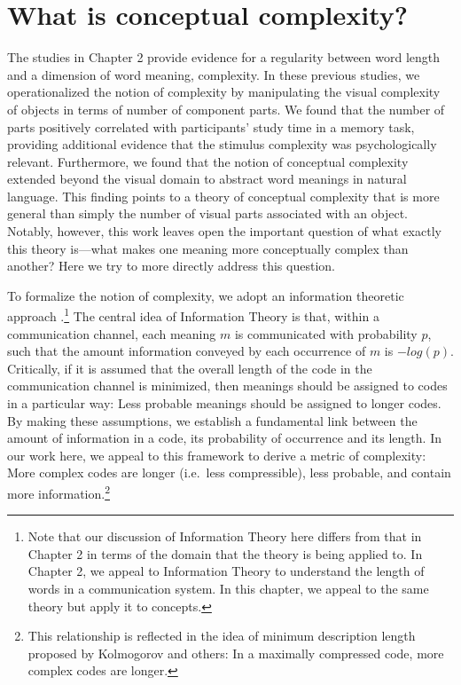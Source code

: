 
\chapter{What is conceptual complexity?}
\label{chapter:complexity}

The studies in Chapter 2 provide evidence for a regularity between word length and a dimension of word meaning, complexity. In these previous studies, we operationalized the notion of complexity by manipulating the visual complexity of objects in terms of number of component parts. We found that the number of parts  positively correlated with participants' study time in a memory task, providing additional evidence that the stimulus complexity was psychologically relevant. Furthermore, we found that the notion of conceptual complexity extended beyond the visual domain to abstract word meanings in natural language. This finding points to a theory of conceptual complexity that is more general than simply the number of visual parts associated with an object.  Notably, however, this work leaves open the important question of what exactly this theory is---what makes one meaning more conceptually complex than another? Here we try to more directly address this question. 

To formalize the notion of complexity, we adopt an information theoretic approach \cite{shannon1948}.\footnote{Note that our discussion of Information Theory here differs from that in Chapter 2 in terms of the domain that the theory is being applied to. In Chapter 2, we appeal to Information Theory to understand the length of words in a communication system. In this chapter, we appeal to the same theory but apply it to  concepts. } The central idea of Information Theory is that, within a communication channel, each meaning $m$ is communicated with probability $p$, such that the amount information conveyed by each occurrence of $m$ is $-log(p)$. Critically, if it is assumed that the overall length of the code in the communication channel is minimized, then meanings should be assigned to codes in a particular way: Less probable meanings should be assigned to longer codes. By making these assumptions, we establish a fundamental link between the amount of information in a code, its probability of occurrence and its length. In our work here, we appeal to this framework to derive a metric of complexity: More complex codes are longer (i.e.\ less compressible), less probable, and contain more information.\footnote{This relationship is reflected in the idea of minimum description length proposed by Kolmogorov and others: In a maximally compressed code, more complex codes are longer.}

